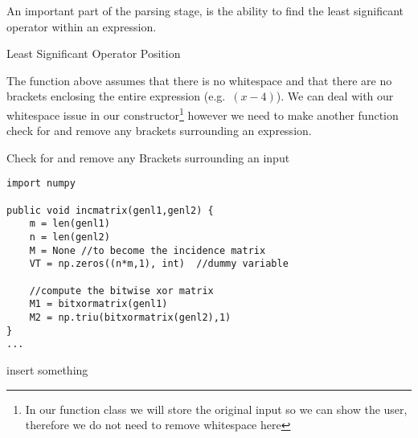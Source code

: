 \documentclass{article}
\newcounter{subsubsubsection}[subsubsection]
\begin{document}
\newpage
{}
An important part of the parsing stage, is the ability to find the least significant operator within an expression.
\begin{algorithm}[H]
\caption{Least Significant Operator Position}
\DontPrintSemicolon
{}
\end{algorithm}
The function above assumes that there is no whitespace and that there are no brackets enclosing the entire expression (e.g.\ $(x-4)$). We can deal with our whitespace issue in our constructor\footnote{In our function class we will store the original input so we can show the user, therefore we do not need to remove whitespace here} however we need to make another function check for and remove any brackets surrounding an expression.
\begin{algorithm}[H]
\DontPrintSemicolon
\caption{Check for and remove any Brackets surrounding an input}
\end{algorithm}
\newpage
\begin{verbatim}
import numpy
 
public void incmatrix(genl1,genl2) {
    m = len(genl1)
    n = len(genl2)
    M = None //to become the incidence matrix
    VT = np.zeros((n*m,1), int)  //dummy variable
 
    //compute the bitwise xor matrix
    M1 = bitxormatrix(genl1)
    M2 = np.triu(bitxormatrix(genl2),1)
}
...
\end{verbatim}
\newpage
\begin{thebibliography}{9}

 insert something




\end{thebibliography}
\end{document}
